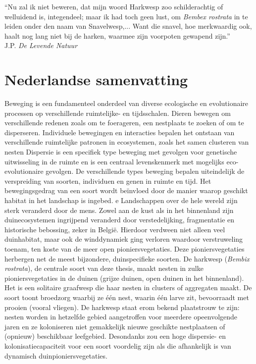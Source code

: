 \documentclass[10pt, twoside]{book} %
\renewcommand{\chaptermark}[1]{\markboth{#1}{}}
\begin{document}
\clearpage
\thispagestyle{empty}		
\vspace*{8.00cm}
\begin{small}
	\noindent ``Nu zal ik niet beweren, dat mijn woord Harkwesp zoo schilderachtig of welluidend is, integendeel; maar ik had toch geen lust, om \textit{Bembex rostrata} in te leiden onder den naam van Snavelwesp,... Want die snavel, hoe merkwaardig ook, haalt nog lang niet bij de harken, waarmee zijn voorpoten gewapend zijn.''\\
	\hspace*{\fill} J.P. \citet{thijsse1901} \textit{De Levende Natuur}
\end{small}
\newpage

\chapter*{Nederlandse samenvatting}
\chaptermark{Nederlandse samenvatting}
  Beweging is een fundamenteel onderdeel van diverse ecologische en evolutionaire processen op verschillende ruimtelijke- en tijdsschalen. Dieren bewegen om verschillende redenen zoals om te foerageren, een nestplaats te zoeken of om te disperseren. Individuele bewegingen en interacties bepalen het ontstaan van verschillende ruimtelijke patronen in ecosystemen, zoals het samen clusteren van nesten Dispersie is een specifiek type beweging met gevolgen voor genetische uitwisseling in de ruimte en is een centraal levenskenmerk met mogelijks eco-evolutionaire gevolgen. De verschillende types beweging bepalen uiteindelijk de verspreiding van soorten, individuen en genen in ruimte en tijd. Het bewegingsgedrag van een soort wordt beïnvloed door de manier waarop geschikt habitat in het landschap is ingebed. e Landschappen over de hele wereld zijn sterk veranderd door de mens. Zowel aan de kust als in het binnenland zijn duinecosystemen ingrijpend veranderd door verstedelijking, fragmentatie en historische bebossing, zeker in Belgi\"{e}. Hierdoor verdween niet alleen veel duinhabitat, maar ook de winddynamiek ging verloren waardoor verstruweling toenam, ten koste van de meer open pioniersvegetaties. Deze pioniersvegetaties herbergen net de meest bijzondere, duinspecifieke soorten. De harkwesp (\textit{Bembix rostrata}), de centrale soort van deze thesis, maakt nesten in zulke pioniersvegetaties in de duinen (grijze duinen, open duinen in het binnenland). Het is een solitaire graafwesp die haar nesten in clusters of aggregaten maakt. De soort toont broedzorg waarbij ze één nest, waarin één larve zit, bevoorraadt met prooien (vooral vliegen). De harkwesp staat erom bekend plaatstrouw te zijn: nesten worden in hetzelfde gebied aangetroffen voor meerdere opeenvolgende jaren en ze koloniseren niet gemakkelijk nieuwe geschikte nestplaatsen of (opnieuw) beschikbaar leefgebied. Desondanks zou een hoge dispersie- en kolonisatiecapaciteit voor een soort voordelig zijn als die afhankelijk is van dynamisch duinpioniersvegetaties.\\
  
\end{document}
